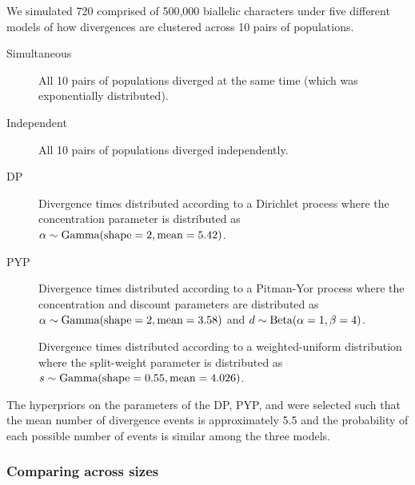 We simulated 720 \datasets comprised of 500,000 biallelic characters under five
different models of how divergences are clustered across 10 pairs of
populations.
\begin{description}
    \item[Simultaneous] All 10 pairs of populations diverged at the same time
        (which was exponentially distributed).
    \item[Independent] All 10 pairs of populations diverged independently.
    \item[DP] Divergence times distributed according to a Dirichlet process
        where the concentration parameter is distributed as
        $\alpha \sim \textrm{Gamma}(\textrm{shape} = 2, \textrm{mean} = 5.42)$.
    \item[PYP] Divergence times distributed according to a Pitman-Yor process
        where the concentration and discount parameters are distributed as
        $\alpha \sim \textrm{Gamma}(\textrm{shape} = 2, \textrm{mean} = 3.58)$
        and
        $d \sim \textrm{Beta}(\alpha = 1, \beta = 4)$.
    \item[\wunif] Divergence times distributed according to a
        weighted-uniform distribution
        where the split-weight parameter is distributed as
        $s \sim \textrm{Gamma}(\textrm{shape} = 0.55, \textrm{mean} = 4.026)$.
\end{description}
The hyperpriors on the parameters of the DP, PYP, and \wunif
were selected such that the mean number of divergence events
is approximately 5.5
and the probability of each possible number of events
is similar among the three models.

\subsubsection{Comparing across \dataset sizes}
